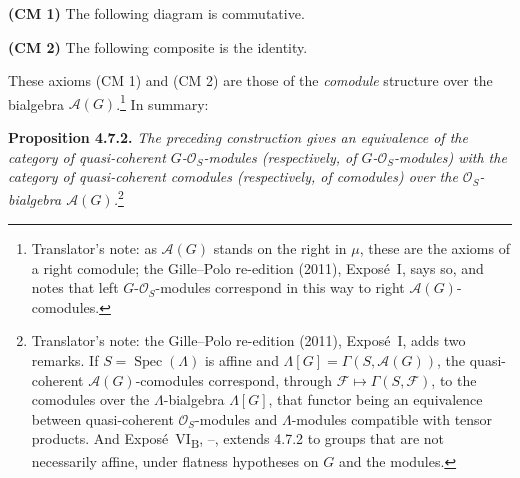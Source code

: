 \medskip
\noindent\textbf{(CM 1)} The following diagram is commutative.

\begin{figure}[H]
  \centering
  
  \label{fig:sga3-exp1-p029-cm1-coaction-square}
\end{figure}

\noindent\textbf{(CM 2)} The following composite is the identity.

\begin{figure}[H]
  \centering
  
  \label{fig:sga3-exp1-p029-cm2-counit-composite}
\end{figure}

These axioms (CM 1) and (CM 2) are those of the \emph{comodule}
structure over the bialgebra \(\mathscr A(G)\).\footnote{Translator's note: as \(\mathscr A(G)\) stands on the
right in \(\mu\), these are the axioms of a right comodule; the Gille--Polo
re-edition (2011), Exposé~I, says so, and notes that left
\(G\)-\(\mathcal O_S\)-modules correspond in this way to right
\(\mathscr A(G)\)-comodules.} In summary:

\medskip
\noindent{}\textbf{Proposition 4.7.2.}
\textit{The preceding construction gives an equivalence of the category
of quasi-coherent \(G\)-\(\mathcal O_S\)-modules (respectively, of
\(G\)-\(\mathcal O_S\)-modules) with the category of quasi-coherent
comodules (respectively, of comodules) over the
\(\mathcal O_S\)-bialgebra \(\mathscr A(G)\).}\footnote{Translator's note: the Gille--Polo re-edition (2011), Exposé~I, adds two
remarks. If \(S=\operatorname{Spec}(\Lambda)\) is affine and
\(\Lambda[G]=\Gamma(S,\mathscr A(G))\), the quasi-coherent
\(\mathscr A(G)\)-comodules correspond, through
\(\mathscr F\mapsto\Gamma(S,\mathscr F)\), to the comodules over the
\(\Lambda\)-bialgebra \(\Lambda[G]\), that functor being an equivalence
between quasi-coherent \(\mathcal O_S\)-modules and \(\Lambda\)-modules
compatible with tensor products. And Exposé~VI\textsubscript{B},
--, extends 4.7.2 to groups that are not
necessarily affine, under flatness hypotheses on \(G\) and the modules.}

